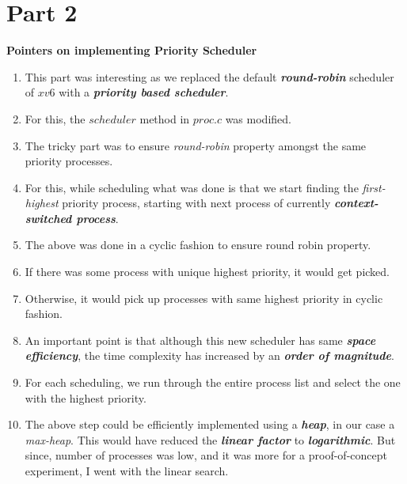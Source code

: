 \documentclass{article}
\newcommand{\bld}[1]{\textbf{#1}}
\newcommand{\ital}[1]{\textit{#1}}
\newcommand{\italb}[1]{\textbf{\textit{#1}}}
\begin{document}
\section*{Part 2}
\bld{Pointers on implementing Priority Scheduler}
\begin{enumerate}
	\item This part was interesting as we replaced the default \italb{round-robin} scheduler of $xv6$ with a  \italb{priority based scheduler}.
	\item For this, the $scheduler$ method in $proc.c$ was modified.
	\item The tricky part was to ensure \ital{round-robin} property amongst the same priority processes.
	\item For this, while scheduling what was done is that we start finding the \ital{first-highest} priority process, starting with next process of currently \italb{context-switched process}.
	\item The above was done in a cyclic fashion to ensure round robin property.
	\item If there was some process with unique highest priority, it would get picked.
	\item Otherwise, it would pick up processes with same highest priority in cyclic fashion.
	\item An important point is that although this new scheduler has same \italb{space efficiency}, the time complexity has increased by an \italb{order of magnitude}.
	\item For each scheduling, we run through the entire process list and select the one with the highest priority.
	\item The above step could be efficiently implemented using a \italb{heap}, in our case a \ital{max-heap}. This would have reduced the \italb{linear factor} to \italb{logarithmic}. But since, number of processes was low, and it was more for a proof-of-concept experiment, I went with the linear search.
\end{enumerate}
\end{document}
